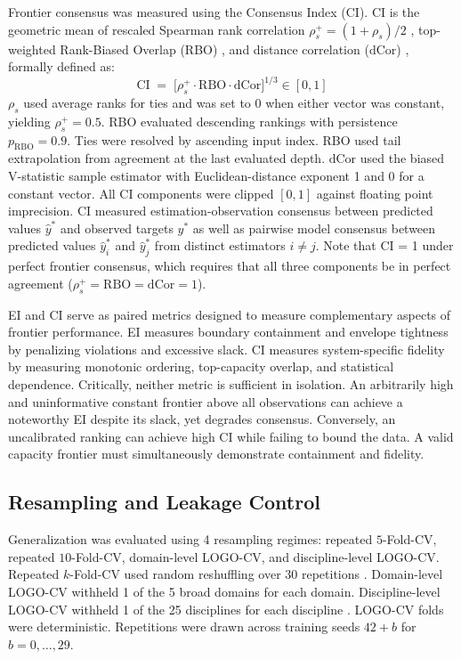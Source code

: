 \documentclass{article}
\begin{document}
Frontier consensus was measured using the Consensus Index (CI). CI is the geometric mean of rescaled Spearman rank correlation $\rho_s^{+} = (1 + \rho_s)/2$ \citep{ref42}, top-weighted Rank-Biased Overlap (RBO) \citep{ref43}, and distance correlation ($\mathrm{dCor}$) \citep{ref44}, formally defined as:
\begin{equation}
\mathrm{CI} \;=\;
\Big[
\rho_s^{+} \cdot \mathrm{RBO} \cdot \mathrm{dCor}
\Big]^{1/3} \in [0, 1]
\label{eq:ci}
\end{equation}
$\rho_s$ used average ranks for ties and was set to 0 when either vector was constant, yielding $\rho_s^{+} = 0.5$. RBO evaluated descending rankings with persistence $p_{\mathrm{RBO}} = 0.9$. Ties were resolved by ascending input index. RBO used tail extrapolation from agreement at the last evaluated depth. $\mathrm{dCor}$ used the biased V-statistic sample estimator with Euclidean-distance exponent 1 and 0 for a constant vector. All CI components were clipped $[0, 1]$ against floating point imprecision. CI measured estimation-observation consensus between predicted values $\widehat{y}^*$ and observed targets $y^*$ as well as pairwise model consensus between predicted values $\widehat{y}^*_i$ and $\widehat{y}^*_j$ from distinct estimators $i \neq j$. Note that CI = 1 under perfect frontier consensus, which requires that all three components be in perfect agreement ($\rho_s^{+} = \mathrm{RBO} = \mathrm{dCor} = 1$).

EI and CI serve as paired metrics designed to measure complementary aspects of frontier performance. EI measures boundary containment and envelope tightness by penalizing violations and excessive slack. CI measures system-specific fidelity by measuring monotonic ordering, top-capacity overlap, and statistical dependence. Critically, neither metric is sufficient in isolation. An arbitrarily high and uninformative constant frontier above all observations can achieve a noteworthy EI despite its slack, yet degrades consensus. Conversely, an uncalibrated ranking can achieve high CI while failing to bound the data. A valid capacity frontier must simultaneously demonstrate containment and fidelity.

\subsection*{Resampling and Leakage Control}
\label{sec:resampling}
Generalization was evaluated using 4 resampling regimes: repeated $5$-Fold-CV, repeated $10$-Fold-CV, domain-level LOGO-CV, and discipline-level LOGO-CV. Repeated $k$-Fold-CV used random reshuffling over 30 repetitions \citep{ref73}. Domain-level LOGO-CV withheld 1 of the 5 broad domains for each domain. Discipline-level LOGO-CV withheld 1 of the 25 disciplines for each discipline \citep{ref68,ref69,ref70,ref74,ref107}. LOGO-CV folds were deterministic. Repetitions were drawn across training seeds $42 + b$ for $b = 0, \ldots, 29$.
\end{document}
